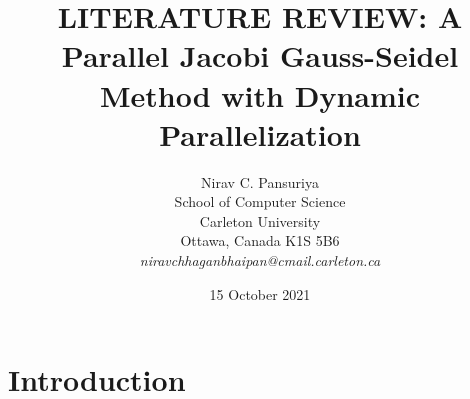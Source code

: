\documentclass[11pt]{article}       %
\begin{document}


\title{LITERATURE REVIEW: A Parallel Jacobi Gauss-Seidel Method with Dynamic Parallelization}


\author{
Nirav C. Pansuriya\\
School of Computer Science\\
Carleton University\\
Ottawa, Canada K1S 5B6\\
{\em niravchhaganbhaipan@cmail.carleton.ca}
} %
\date{15 October 2021}
\maketitle



\section{Introduction} \label{intro}
\end{document}
